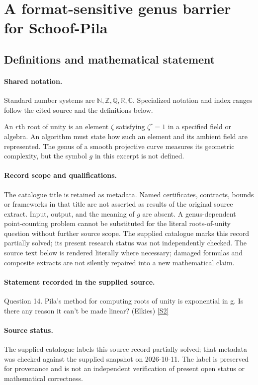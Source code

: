 \documentclass[11pt]{article}
\newcommand{\sref}[2]{\hyperlink{source:#1:#2}{[S#2]}}
\begin{document}
\section{A format-sensitive genus barrier for Schoof-Pila}\label{statement}

\subsection{Definitions and mathematical statement}

\paragraph{Shared notation.}Standard number systems are $\mathbb N,\mathbb Z,\mathbb Q,\mathbb R,\mathbb C$. Specialized notation and index ranges follow the cited source and the definitions below.


An $r$th root of unity is an element $\zeta$ satisfying $\zeta^r=1$ in a specified field or algebra. An algorithm must state how such an element and its ambient field are represented. The genus of a smooth projective curve measures its geometric complexity, but the symbol $g$ in this excerpt is not defined.
\paragraph{Record scope and qualifications.}
The catalogue title is retained as metadata. Named certificates, contracts, bounds or frameworks in that title are not asserted as results of the original source extract.
Input, output, and the meaning of $g$ are absent. A genus-dependent point-counting problem cannot be substituted for the literal roots-of-unity question without further source scope. The supplied catalogue marks this record partially solved; its present research status was not independently checked.
The source text below is rendered literally where necessary; damaged formulas and composite extracts are not silently repaired into a new mathematical claim.
\paragraph{Statement recorded in the supplied source.}
Question 14. Pila's method for computing roots of unity is exponential in g. Is there any reason it can't be made linear? (Elkies) \sref{statement}{2}
\paragraph{Source status.}
The supplied catalogue labels this source record partially solved; that metadata was checked against the supplied snapshot on 2026-10-11. The label is preserved for provenance and is not an independent verification of present open status or mathematical correctness.
\end{document}
